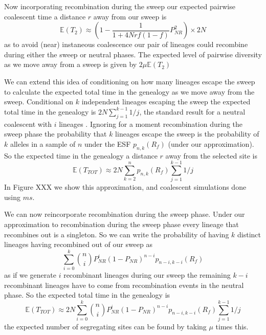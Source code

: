 \documentclass[a4paper,10pt]{article}
\begin{document}
Now incorporating recombination during the sweep our expected pairwise coalescent time a distance $r$ away from our sweep is 
\begin{equation}
\mathbb{E}(T_2) \approx \left(1-\frac{1}{1 + 4Nrf(1-f)} P_{NR}^2  \right) \times 2N
\end{equation}
as to avoid (near) instaneous coalescence our pair of lineages could recombine during either the sweep or neutral phases. The expected level of pairwise diversity as we move away from a sweep is given by $2\mu \mathbb{E}(T_2)$

We can extend this idea of conditioning on how many lineages escape the sweep to calculate the expected total time in the genealogy as we move away from the sweep. Conditional on  $k$ independent lineages escaping the sweep the expected total time in the genealogy is $2N \sum_{j=1}^{k-1} 1/j$, the standard result for a neutral coalescent with $i$ lineages \citep{Watterson}. Ignoring for a moment recombination during the sweep phase the probability that $k$ lineages escape the sweep is the probability of $k$ alleles in a sample of $n$ under the ESF $p_{n,k}(R_f) $ (under our approximation). So the expected time in the genealogy a distance $r$ away from the selected site is 
\begin{equation}
\mathbb{E}(T_{TOT})  \approx 2N \sum_{k=2}^n p_{n,k}(R_f)   \sum_{j=1}^{k-1} 1/j
\end{equation}
In Figure XXX we show this approximation, and coalescent simulations done using $ms$. 

We can now reincorporate recombination during the sweep phase. Under our approximation to recombination during the sweep phase every lineage that recombines out is a singleton. So we can write the probability of having $k$ distinct lineages having recombined out of our sweep as
\begin{equation}
\sum_{i=0}^{k} {n \choose i} P_{NR}^{i} (1-P_{NR})^{n-i} p_{n-i,k-i}(R_f)
\end{equation}
as if we generate $i$ recombinant lineages during our sweep the remaining $k-i$ recombinant lineages have to come from recombination events in the neutral phase. So the expected total time in the genealogy is 
\begin{equation}
\mathbb{E}(T_{TOT})  \approx 2N \sum_{i=0}^{k} {n \choose i} P_{NR}^{i} (1-P_{NR})^{n-i} p_{n-i,k-i}(R_f)   \sum_{j=1}^{k-1} 1/j
\end{equation}
the expected number of segregating sites can be found by taking $\mu$ times this. 
\end{document}
